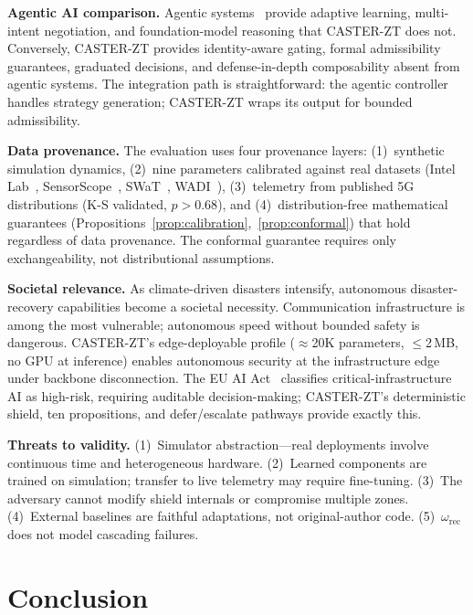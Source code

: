 \documentclass[lettersize,journal]{IEEEtran}
\begin{document}
\noindent\textbf{Agentic AI comparison.}
Agentic systems~\cite{toward_autonomous_oran_2026,demirel2026agentic} provide adaptive learning, multi-intent negotiation, and foundation-model reasoning that CASTER-ZT does not.
Conversely, CASTER-ZT provides identity-aware gating, formal admissibility guarantees, graduated decisions, and defense-in-depth composability absent from agentic systems.
The integration path is straightforward: the agentic controller handles strategy generation; CASTER-ZT wraps its output for bounded admissibility.

\noindent\textbf{Data provenance.}
The evaluation uses four provenance layers: (1)~synthetic simulation dynamics, (2)~nine parameters calibrated against real datasets (Intel Lab~\cite{intel_lab_data_2004}, SensorScope~\cite{sensorscope2008}, SWaT~\cite{goh2017swat}, WADI~\cite{wadi2018}), (3)~telemetry from published 5G distributions (K-S validated, $p>0.68$), and (4)~distribution-free mathematical guarantees (Propositions~\ref{prop:calibration},~\ref{prop:conformal}) that hold regardless of data provenance.
The conformal guarantee requires only exchangeability, not distributional assumptions.

\noindent\textbf{Societal relevance.}
As climate-driven disasters intensify, autonomous disaster-recovery capabilities become a societal necessity.
Communication infrastructure is among the most vulnerable; autonomous speed without bounded safety is dangerous.
CASTER-ZT's edge-deployable profile ($\approx$20K parameters, $\le$2\,MB, no GPU at inference) enables autonomous security at the infrastructure edge under backbone disconnection.
The EU AI Act~\cite{euaiact2024} classifies critical-infrastructure AI as high-risk, requiring auditable decision-making; CASTER-ZT's deterministic shield, ten propositions, and defer/escalate pathways provide exactly this.

\noindent\textbf{Threats to validity.}
(1)~Simulator abstraction---real deployments involve continuous time and heterogeneous hardware.
(2)~Learned components are trained on simulation; transfer to live telemetry may require fine-tuning.
(3)~The adversary cannot modify shield internals or compromise multiple zones.
(4)~External baselines are faithful adaptations, not original-author code.
(5)~$\omega_{\mathrm{rec}}$ does not model cascading failures.


\section{Conclusion}
\label{sec:conclusion}
\end{document}

